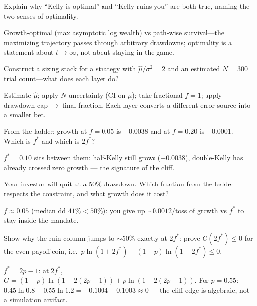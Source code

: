 \begin{exercise}[hard]
Explain why ``Kelly is optimal'' and ``Kelly ruins you'' are both true, naming the two
senses of optimality.
\end{exercise}
\begin{solution}
Growth-optimal (max asymptotic log wealth) vs path-wise survival---the maximizing
trajectory passes through arbitrary drawdowns; optimality is a statement about $t\to\infty$,
not about staying in the game.
\end{solution}

\begin{exercise}[hard]
Construct a sizing stack for a strategy with $\hat\mu/\sigma^2=2$ and an estimated
$N{=}300$ trial count---what does each layer do?
\end{exercise}
\begin{solution}
Estimate $\hat\mu$; apply $N$-uncertainty (CI on $\mu$); take fractional $f=1$;
apply drawdown cap $\to$ final fraction. Each layer converts a different error source
into a smaller bet.
\end{solution}

\begin{exercise}[easy]
From the ladder: growth at $f=0.05$ is $+0.0038$ and at $f=0.20$
is $-0.0001$. Which is $f^*$ and which is $2f^*$?
\end{exercise}
\begin{solution}
$f^*=0.10$ sits between them: half-Kelly still grows
($+0.0038$), double-Kelly has already crossed zero growth ---
the signature of the cliff.
\end{solution}
\begin{exercise}[medium]
Your investor will quit at a 50\% drawdown. Which fraction from
the ladder respects the constraint, and what growth does it
cost?
\end{exercise}
\begin{solution}
$f\approx0.05$ (median dd $41\%<50\%$): you give up
$\sim0.0012$/toss of growth vs $f^*$ to stay inside the mandate.
\end{solution}
\begin{exercise}[hard]
Show why the ruin column jumps to $\sim$50\% exactly at $2f^*$:
prove $G(2f^*)\le0$ for the even-payoff coin, i.e.\
$p\ln(1+2f^*)+(1-p)\ln(1-2f^*)\le0$.
\end{exercise}
\begin{solution}
$f^*=2p-1$: at $2f^*$, $G=(1-p)\ln(1-2(2p-1))+p\ln(1+2(2p-1))$.
For $p=0.55$: $0.45\ln0.8+0.55\ln1.2 = -0.1004+0.1003\approx0$
--- the cliff edge is algebraic, not a simulation artifact.
\end{solution}

